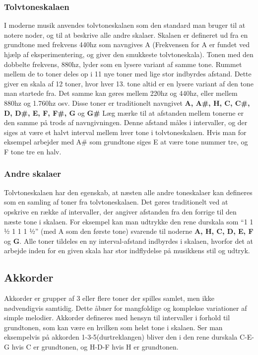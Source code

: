 \subsubsection{Tolvtoneskalaen}
I moderne musik anvendes tolvtoneskalaen som den standard man bruger til at notere noder, og til at beskrive alle andre skalaer. 
Skalaen er defineret ud fra en grundtone med frekvens 440hz som navngives A (Frekvensen for A er fundet ved hjælp af eksperimentering, og giver den smukkeste tolvtoneskala). \cite{msparkMusic}
Tonen med den dobbelte frekvens, 880hz, lyder som en lysere variant af samme tone. Rummet mellem de to toner deles op i 11 nye toner med lige stor indbyrdes afstand. Dette giver en skala af 12 toner, hvor hver 13. tone altid er en lysere variant af den tone man startede fra.
Det samme kan gøres mellem 220hz og 440hz, eller mellem 880hz og 1.760hz osv. \cite{msparkMusic}
Disse toner er traditionelt navngivet \textbf{A, A#, H, C, C#, D, D#, E, F, F#, G} og \textbf{G#} 
Læg mærke til at afstanden mellem tonerne er den samme på trods af navngivningen. Denne afstand måles i intervaller, og der siges at være et halvt interval mellem hver tone i tolvtoneskalaen. Hvis man for eksempel arbejder med A# som grundtone siges E at være tone nummer tre, og F tone tre en halv. \cite{msparkMusic}
\subsubsection{Andre skalaer}
Tolvtoneskalaen har den egenskab, at næsten alle andre toneskalaer kan defineres som en samling af toner fra tolvtoneskalaen. \cite{msparkMusic}
Det gøres traditionelt ved at opskrive en række af intervaller, der angiver afstanden fra den forrige til den næste tone i skalaen.
For eksempel kan man udtrykke den rene durskala som “1 1 ½ 1 1 1 ½” (med A som den første tone) svarende til noderne \textbf{A, H, C, D, E, F} og \textbf{G}.
Alle toner tildeles en ny interval-afstand indbyrdes i skalaen, hvorfor det at arbejde inden for en given skala har stor indflydelse på musikkens stil og udtryk. \cite{msparkMusic}
\subsection{Akkorder}
Akkorder er grupper af 3 eller flere toner der spilles samlet, men ikke nødvendigvis samtidig. Dette åbner for mangfoldige og komplekse variationer af simple melodier.
Akkorder defineres med hensyn til intervaller i forhold til grundtonen, som kan være en hvilken som helst tone i skalaen. \cite{msparkMusic}
Ser man eksempelvis på akkorden 1-3-5(durtreklangen) bliver den i den rene durskala C-E-G hvis C er grundtonen, og H-D-F hvis H er grundtonen.

